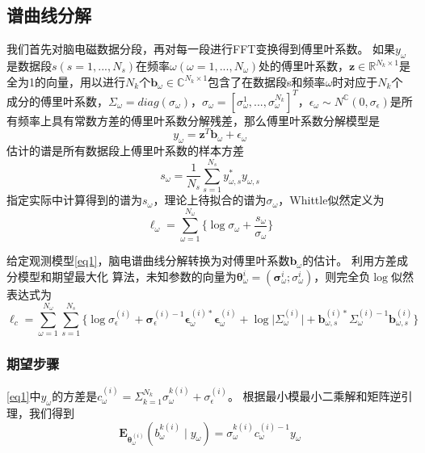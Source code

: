 \subsection{谱曲线分解}
我们首先对脑电磁数据分段，再对每一段进行FFT变换得到傅里叶系数。 如果$y_\omega$是数据段$s(s=1,...,N_s)$在频率$\omega(\omega=1,...,N_\omega)$处的傅里叶系数，$\mathbf{z}\in{\mathbb{R}^{N_k\times{1}}}$是全为1的向量，用以进行$N_k$个$\mathbf{b}_\omega\in{\mathbb{C}^{N_k\times{1}}}$包含了在数据段s和频率$\omega$时对应于$N_k$个成分的傅里叶系数，$\Sigma_\omega=diag(\sigma_\omega)$，$\sigma_\omega=[\sigma_\omega^1,...,\sigma_\omega^{N_k}]^T$，$\epsilon_\omega\sim{N^\mathbb{C}(0,\sigma_\epsilon)}$是所有频率上具有常数方差的傅里叶系数分解残差，那么傅里叶系数分解模型是
\begin{equation}\label{eq1}
y_\omega=\mathbf{z}^T\mathbf{b}_\omega+\epsilon_\omega
\end{equation}
估计的谱是所有数据段上傅里叶系数的样本方差
\begin{equation}\label{eq2}
s_\omega=\frac{1}{N_s}\sum_{s=1}^{N_s}y_{\omega,s}^*y_{\omega,s}
\end{equation}
指定实际中计算得到的谱为$s_\omega$，理论上待拟合的谱为$\sigma_\omega$，Whittle似然定义为
\begin{equation}\label{eq3}
\ell_\omega=\sum_{\omega=1}^{N_\omega}\lbrace\log{\sigma_\omega}+\frac{s_\omega}{\sigma_\omega}\rbrace
\end{equation}

给定观测模型\eqref{eq1}，脑电谱曲线分解转换为对傅里叶系数$\mathbf{b}_\omega$的估计。 利用方差成分模型和期望最大化
算法，未知参数的向量为$\mathbf{\theta}_\omega^{i}=(\mathbf{\sigma}_\omega^{i};\sigma_\omega^{i})$，则完全负$\log$似然表达式为
\begin{equation}\label{eq4}
\ell_c=\sum_{\omega=1}^{N_\omega}\sum_{s=1}^{N_s}\lbrace\log{\sigma}_\epsilon^{(i)}+\mathbf{\sigma}_\epsilon^{(i)-1}\mathbf{\epsilon}_\omega^{(i)*}\mathbf{\epsilon}_\omega^{(i)}+\log\lvert\Sigma_\omega^{(i)}\rvert+\mathbf{b}_{\omega,s}^{(i)*}\Sigma_\omega^{(i)-1}\mathbf{b}_{\omega,s}^{(i)}\rbrace
\end{equation}

\subsubsection{期望步骤}
\eqref{eq1}中$y_\omega$的方差是$c_\omega^{(i)}=\Sigma_{k=1}^{N_k}\sigma_\omega^{k(i)}+\sigma_\epsilon^{(i)}$。 根据最小模最小二乘解和矩阵逆引理，我们得到
\begin{equation}\label{eq5}
\mathbf{E}_{\mathbf{\theta}_\omega^{(i)}}(b_\omega^{k(i)}\mid{y}_\omega)=\sigma_\omega^{k(i)}c_\omega^{(i)-1}y_\omega
\end{equation}

